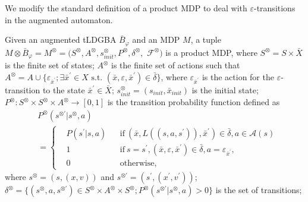 We modify the standard definition of a product MDP to deal with $\varepsilon$-transitions in the augmented automaton.
\begin{definition}
  Given an augmented tLDGBA $\bar{B}_{\varphi}$ and an MDP $M$, a tuple $M \otimes \bar{B}_{\varphi} = M^{\otimes} = (S^{\otimes}, A^{\otimes},s_{init}^{\otimes}, P^{\otimes}, \delta^{\otimes},$ $ {\mathcal F}^{\otimes})$ is a product MDP, where
  $S^{\otimes} = S \times \bar{X}$ is the finite set of states;
  $A^{\otimes}$  is the finite set of actions such that $A^{\otimes}=A \cup \{ \varepsilon_{\bar{x}^{\prime}} ; \exists \bar{x}^{\prime}\! \in \! X \text{ s.t. } (\bar{x},\varepsilon,\bar{x}^{\prime}) \in \bar{\delta} \}$, where $\varepsilon_{\bar{x}^{\prime}}$ is the action for the $\varepsilon$-transition to the state $\bar{x}^{\prime}\! \in\! \bar{X}$;
  $s_{init}^{\otimes} = (s_{init},\bar{x}_{init})$ is the initial state; $P^{\otimes} : S^{\otimes} \times S^{\otimes} \times A^{\otimes} \rightarrow [0,1]$ is the transition probability function defined as
  \begin{align*}
    &P^{\otimes}(s^{\otimes \prime} | s^{\otimes}, a) \\ &=
    \left\{
    \begin{aligned}
      &P(s^{\prime} | s, a) &   &\text{if}\  (\bar{x}, L((s,a,s^{\prime})), \bar{x}^{\prime}) \in \bar{\delta}, a \in \mathcal{A}(s)\\
      &1 &   &\text{if}\ s=s^{\prime}, (\bar{x}, \varepsilon, \bar{x}^{\prime}) \in  \bar{\delta}, a=\varepsilon_{\bar{x}^{\prime}},\\
      &0 &   &\text{otherwise} ,
    \end{aligned}
    \right. \nonumber
  \end{align*}
  where $s^{\otimes}=(s,(x,v))$ and $s^{\otimes \prime}=(s^{\prime},(x^{\prime},v^{\prime}))$;
  $\delta^{\otimes} = \{ (s^{\otimes}, a, s^{\otimes \prime})\in S^{\otimes} \times A^{\otimes} \times S^{\otimes} ; P^{\otimes}(s^{\otimes \prime} | s^{\otimes}, a) > 0 \}$ is the set of transitions;

\end{definition}
